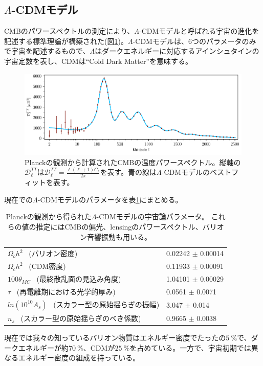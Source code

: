 \subsection{$\Lambda$-CDMモデル}
CMBのパワースペクトルの測定により、$\Lambda$-CDMモデルと呼ばれる宇宙の進化を記述する標準理論が構築された(図\ref{fit_planck})。$\Lambda$-CDMモデルは、6つのパラメータのみで宇宙を記述するもので、$\Lambda$はダークエネルギーに対応するアインシュタインの宇宙定数を表し、CDMは``Cold Dark Matter''を意味する。
\begin{figure}[htbp]
  \centering
  \includegraphics[width=0.85\columnwidth]{2_cosmology/figs/plank_cltt.pdf}
  \caption{Planckの観測から計算されたCMBの温度パワースペクトル\cite{Planck_T}。縦軸の$\mathcal{D}^{TT}_{\ell}$は$\mathcal{D}^{TT}_{\ell} = \frac{\ell(\ell+1)C_{\ell}}{2\pi}$を表す。青の線は$\Lambda$-CDMモデルのベストフィットを表す。}
  \label{fit_planck}
\end{figure}
現在での$\Lambda$-CDMモデルのパラメータを表\ref{6params}にまとめる。
\vspace{2mm}
\begin{table}[htbp]
  \centering
  \caption{Planckの観測から得られた$\Lambda$-CDMモデルの宇宙論パラメータ\cite{Planck_T}。
  これらの値の推定にはCMBの偏光、lensingのパワースペクトル、バリオン音響振動も用いる。}
  \vspace{2mm}
  \begin{tabular}{l|l}\hline
    $\Omega_{b} h^2$ ~(バリオン密度)& 0.02242 $\pm$ 0.00014 \\
    $\Omega_{c} h^2$ ~(CDM密度)& 0.11933 $\pm$ 0.00091 \\
    $100\theta_{MC}$ ~(最終散乱面の見込み角度) & 1.04101 $\pm$ 0.00029 \\
    $\tau$ ~(再電離期における光学的厚み)& 0.0561 $\pm$ 0.0071 \\
    $ln(10^{10}A_s)$ ~(スカラー型の原始揺らぎの振幅) & 3.047 $\pm$ 0.014 \\
    $n_s$ ~(スカラー型の原始揺らぎのべき係数)& 0.9665 $\pm$ 0.0038 \\ \hline
  \end{tabular}
  \label{6params}
\end{table}
現在では我々の知っているバリオン物質はエネルギー密度でたったの$\SI{5}{\%}$で、ダークエネルギーが約$\SI{70}{\%}$、CDMが$\SI{25}{\%}$を占めている。一方で、宇宙初期では異なるエネルギー密度の組成を持っている。

